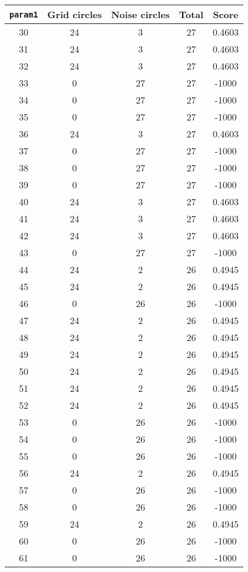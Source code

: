 \documentclass[letterpaper, 12pt]{article}
\begin{document}
\begin{longtable}{|c|c|c|c|c|}
\hline
\textbf{\texttt{param1}} & \textbf{Grid circles} & \textbf{Noise circles} & \textbf{Total} & \textbf{Score} \\
\hline
30 & 24 & 3 & 27 & 0.4603 \\
\hline
31 & 24 & 3 & 27 & 0.4603 \\
\hline
32 & 24 & 3 & 27 & 0.4603 \\
\hline
33 & 0 & 27 & 27 & -1000 \\
\hline
34 & 0 & 27 & 27 & -1000 \\
\hline
35 & 0 & 27 & 27 & -1000 \\
\hline
36 & 24 & 3 & 27 & 0.4603 \\
\hline
37 & 0 & 27 & 27 & -1000 \\
\hline
38 & 0 & 27 & 27 & -1000 \\
\hline
39 & 0 & 27 & 27 & -1000 \\
\hline
40 & 24 & 3 & 27 & 0.4603 \\
\hline
41 & 24 & 3 & 27 & 0.4603 \\
\hline
42 & 24 & 3 & 27 & 0.4603 \\
\hline
43 & 0 & 27 & 27 & -1000 \\
\hline
44 & 24 & 2 & 26 & 0.4945 \\
\hline
45 & 24 & 2 & 26 & 0.4945 \\
\hline
46 & 0 & 26 & 26 & -1000 \\
\hline
47 & 24 & 2 & 26 & 0.4945 \\
\hline
48 & 24 & 2 & 26 & 0.4945 \\
\hline
49 & 24 & 2 & 26 & 0.4945 \\
\hline
50 & 24 & 2 & 26 & 0.4945 \\
\hline
51 & 24 & 2 & 26 & 0.4945 \\
\hline
52 & 24 & 2 & 26 & 0.4945 \\
\hline
53 & 0 & 26 & 26 & -1000 \\
\hline
54 & 0 & 26 & 26 & -1000 \\
\hline
55 & 0 & 26 & 26 & -1000 \\
\hline
56 & 24 & 2 & 26 & 0.4945 \\
\hline
57 & 0 & 26 & 26 & -1000 \\
\hline
58 & 0 & 26 & 26 & -1000 \\
\hline
59 & 24 & 2 & 26 & 0.4945 \\
\hline
60 & 0 & 26 & 26 & -1000 \\
\hline
61 & 0 & 26 & 26 & -1000 \\

\end{longtable}
\end{document}
